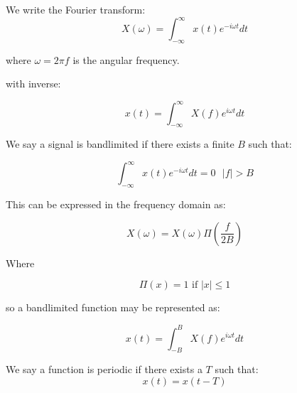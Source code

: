 \begin{definition}

We write the Fourier transform:
\begin{equation}
X\left(\omega\right) = \int_{-\infty}^{\infty} x\left(t\right)e^{-i \omega t} dt
\end{equation}

where \(\omega = 2 \pi f\) is the angular frequency.

with inverse:

\begin{equation}
x\left(t\right) = \int_{-\infty}^{\infty} X\left(f\right)e^{i  \omega t} dt
\end{equation}

\end{definition}

\begin{definition}

We say a signal is bandlimited if there exists a finite \(B\) such that:

\begin{equation}
\int_{-\infty}^{\infty} x\left(t\right)e^{-i \omega t} dt = 0 \text { } |f|>B
\end{equation}

This can be expressed in the frequency domain as:

\begin{equation}
X\left(\omega\right) = X\left(\omega\right)\Pi\left(\frac{f}{2B}\right)
\end{equation}

Where 

\begin{equation}
\Pi\left(x\right) = 1 \text{ if } |x| \leq 1 
\end{equation}

so a bandlimited function may be represented as:

\begin{equation}
x\left(t\right) = \int_{-B}^{B} X\left(f\right)e^{i \omega t} dt
\end{equation}

\end{definition}

\begin{definition}
We say a function is periodic if there exists a \(T\) such that:
\begin{equation}
x\left(t\right) = x\left(t - T\right)
\end{equation}
\end{definition}

